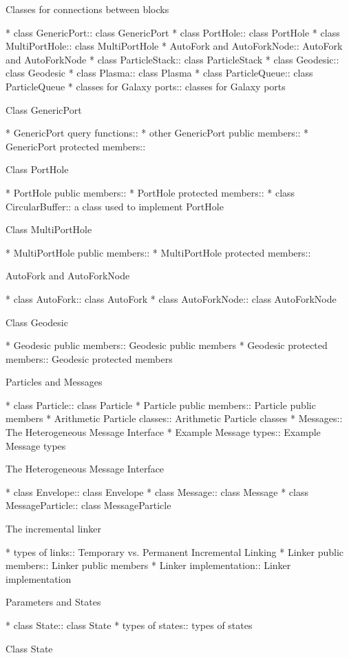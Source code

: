 Classes for connections between blocks

* class GenericPort::  class GenericPort
* class PortHole::  class PortHole
* class MultiPortHole::  class MultiPortHole
* AutoFork and AutoForkNode::  AutoFork and AutoForkNode
* class ParticleStack::  class ParticleStack
* class Geodesic::  class Geodesic
* class Plasma::    class Plasma
* class ParticleQueue::  class ParticleQueue
* classes for Galaxy ports::  classes for Galaxy ports

Class GenericPort

* GenericPort query functions::  
* other GenericPort public members::  
* GenericPort protected members::  

Class PortHole

* PortHole public members::  
* PortHole protected members::  
* class CircularBuffer::  a class used to implement PortHole

Class MultiPortHole

* MultiPortHole public members::  
* MultiPortHole protected members::  

AutoFork and AutoForkNode

* class AutoFork::  class AutoFork
* class AutoForkNode::  class AutoForkNode

Class Geodesic

* Geodesic public members::  Geodesic public members
* Geodesic protected members::  Geodesic protected members

Particles and Messages

* class Particle::  class Particle
* Particle public members::  Particle public members
* Arithmetic Particle classes::  Arithmetic Particle classes
* Messages::        The Heterogeneous Message Interface
* Example Message types::  Example Message types

The Heterogeneous Message Interface

* class Envelope::  class Envelope
* class Message::   class Message
* class MessageParticle::  class MessageParticle

The incremental linker

* types of links::  Temporary vs. Permanent Incremental Linking
* Linker public members::  Linker public members
* Linker implementation::  Linker implementation

Parameters and States

* class State::     class State
* types of states::  types of states

Class State

